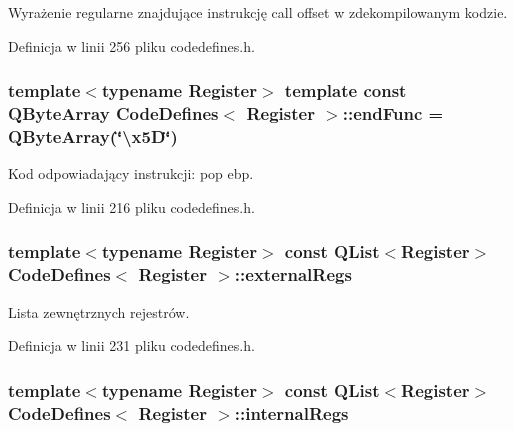 Wyrażenie regularne znajdujące instrukcję call offset w zdekompilowanym kodzie. 



Definicja w linii 256 pliku codedefines.\-h.

\hypertarget{class_code_defines_abb945f5e809b498405e0a91901c784e1}{
\subsubsection[{end\-Func}]{\setlength{\rightskip}{0pt plus 5cm}template$<$typename Register$>$ template const Q\-Byte\-Array {\bf Code\-Defines}$<$ Register $>$\-::end\-Func = Q\-Byte\-Array(\char`\"{}\textbackslash{}x5\-D\char`\"{})\hspace{0.3cm}{\ttfamily [static]}}}\label{class_code_defines_abb945f5e809b498405e0a91901c784e1}


Kod odpowiadający instrukcji\-: pop ebp. 



Definicja w linii 216 pliku codedefines.\-h.

\hypertarget{class_code_defines_a045622ec64ec17b4b8a2d55b854117c7}{
\subsubsection[{external\-Regs}]{\setlength{\rightskip}{0pt plus 5cm}template$<$typename Register$>$ const Q\-List$<$Register$>$ {\bf Code\-Defines}$<$ Register $>$\-::external\-Regs\hspace{0.3cm}{\ttfamily [static]}}}\label{class_code_defines_a045622ec64ec17b4b8a2d55b854117c7}


Lista zewnętrznych rejestrów. 



Definicja w linii 231 pliku codedefines.\-h.

\hypertarget{class_code_defines_a71b60a174fc6190178fee7c552f52732}{
\subsubsection[{internal\-Regs}]{\setlength{\rightskip}{0pt plus 5cm}template$<$typename Register$>$ const Q\-List$<$Register$>$ {\bf Code\-Defines}$<$ Register $>$\-::internal\-Regs\hspace{0.3cm}{\ttfamily [static]}}}\label{class_code_defines_a71b60a174fc6190178fee7c552f52732}


